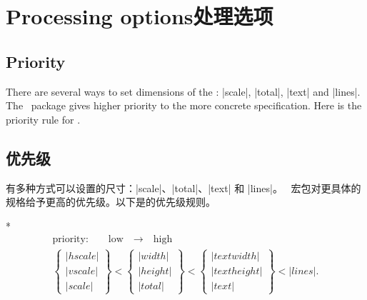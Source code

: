 
 \section{Processing options\hfill 处理选项}\label{sec:process}
 
% 
% 

\begin{paracol}{2}
\subsection{Priority}\label{sec:priority}

There are several ways to set dimensions of the :
|scale|, |total|, |text| and |lines|. The \Gm\ package gives higher
priority to the more concrete specification. Here is the priority
rule for .

\switchcolumn
\subsection{优先级}

有多种方式可以设置的尺寸：|scale|、|total|、|text| 和 |lines|。
\Gm\ 宏包对更具体的规格给予更高的优先级。以下是的优先级规则。

\switchcolumn[0]*
 \[\begin{array}{c}
 \textrm{priority:}\qquad\textrm{low}\quad
    \longrightarrow\quad\textrm{high}\\[1em]
 \left\{\begin{array}{l}|hscale|\\|vscale|\\|scale|
        \end{array}\right\} <
 \left\{\begin{array}{l}|width|\\|height|\\|total|
        \end{array}\right\} <
 \left\{\begin{array}{l}|textwidth|\\|textheight|
         \\|text|\end{array}\right\} < |lines|.
 \end{array}\]


\end{paracol}
